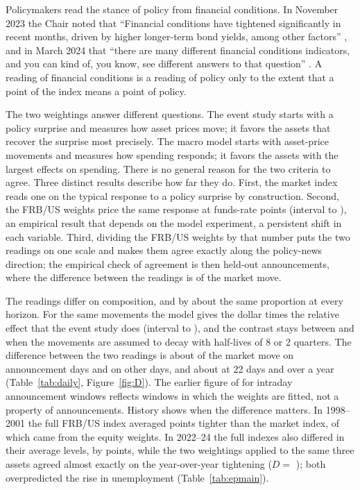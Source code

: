 \documentclass[11pt]{article}
\begin{document}
Policymakers read the stance of policy from financial conditions. In November 2023 the Chair noted that ``Financial conditions have tightened significantly in recent months, driven by higher longer-term bond yields, among other factors'' \citep{powell2023}, and in March 2024 that ``there are many different financial conditions indicators, and you can kind of, you know, see different answers to that question'' \citep{powell2024}. A reading of financial conditions is a reading of policy only to the extent that a point of the index means a point of policy.

The two weightings answer different questions. The event study starts with a policy surprise and measures how asset prices move; it favors the assets that recover the surprise most precisely. The macro model starts with asset-price movements and measures how spending responds; it favors the assets with the largest effects on spending. There is no general reason for the two criteria to agree. Three distinct results describe how far they do. First, the market index reads one on the typical response to a policy surprise by construction. Second, the FRB/US weights price the same response at  funds-rate points (interval  to ), an empirical result that depends on the model experiment, a persistent shift in each variable. Third, dividing the FRB/US weights by that number puts the two readings on one scale and makes them agree exactly along the policy-news direction; the empirical check of agreement is then held-out announcements, where the difference between the readings is  of the market move.

The readings differ on composition, and by about the same proportion at every horizon. For the same movements the model gives the dollar  times the relative effect that the event study does (interval  to ), and the contrast stays between  and  when the movements are assumed to decay with half-lives of 8 or 2 quarters. The difference between the two readings is about  of the market move on announcement days and  on other days, and about  at 22 days and  over a year (Table~\ref{tab:daily}, Figure~\ref{fig:D}). The earlier figure of  for intraday announcement windows reflects windows in which the weights are fitted, not a property of announcements. History shows when the difference matters. In 1998--2001 the full FRB/US index averaged  points tighter than the market index, of which  came from the equity weights. In 2022--24 the full indexes also differed in their average levels, by  points, while the two weightings applied to the same three assets agreed almost exactly on the year-over-year tightening ($D=$ ); both overpredicted the rise in unemployment (Table~\ref{tab:epmain}).
\end{document}

